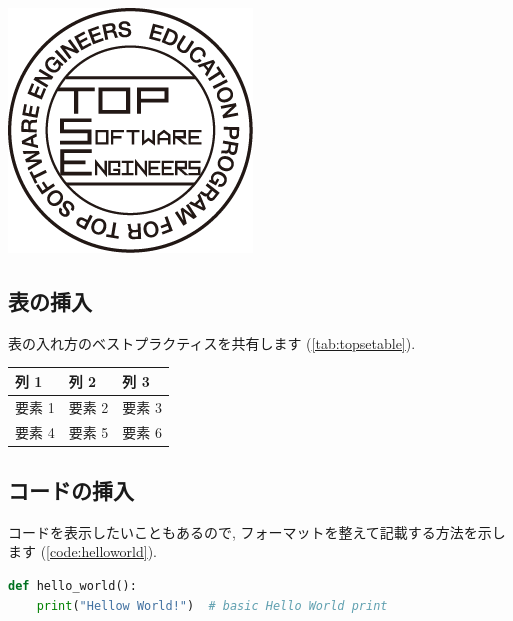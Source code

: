 \documentclass[a4paper,9pt]{extarticle}
\begin{document}
\begin{multicols}{2}
\begin{center}
\begin{minipage}{\linewidth}
\centering
\includegraphics[width=0.5\linewidth]{image.png}
\label{fig:topselogo}
\end{minipage}
\end{center}

\subsection{表の挿入}
表の入れ方のベストプラクティスを共有します (\autoref{tab:topsetable}).
\begin{center}
\begin{minipage}{\linewidth}
\centering
{}
\noindent\begin{tabularx}{\linewidth}{|X|X|X|}  
\hline
\textbf{列 1} & \textbf{列 2} & \textbf{列 3} \\
\hline
要素 1 & 要素 2 & 要素 3 \\
\hline
要素 4 & 要素 5 & 要素 6 \\
\hline
\end{tabularx}
\label{tab:topsetable}
\end{minipage}
\end{center}

\subsection{コードの挿入}
コードを表示したいこともあるので, フォーマットを整えて記載する方法を示します (\autoref{code:helloworld}).

\begin{minipage}{0.95\linewidth}
\begin{lstlisting}[language=Python,caption={コードのキャプションはこちら.},label={code:helloworld}]
def hello_world():
    print("Hellow World!")  # basic Hello World print


\end{lstlisting}
\end{minipage}
\end{multicols}
\end{document}
